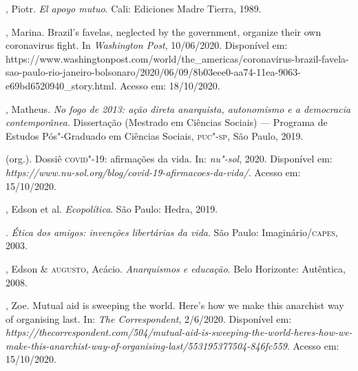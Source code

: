 \begin{bibliohedra}
, Piotr. \emph{El apoyo mutuo}. Cali: Ediciones Madre Tierra,
1989.

, Marina. Brazil's favelas, neglected by the government, organize
their own coronavirus fight. In \emph{Washington Post}, 10/06/2020.
Disponível em:
https://www.washingtonpost.com/world/the\_americas/coronavirus-brazil-favela-sao-paulo-rio-janeiro-bolsonaro/2020/06/09/8b03eee0-aa74-11ea-9063-e69bd6520940\_story.html.
Acesso em: 18/10/2020.

, Matheus. \emph{No fogo de 2013: ação direta anarquista,
autonomismo e a democracia contemporânea}. Dissertação (Mestrado em
Ciências Sociais) --- Programa de Estudos Pós"-Graduado em Ciências
Sociais, \textsc{puc"-sp}, São Paulo, 2019.

 (org.). Dossiê \textsc{covid}"-19: afirmações da vida. In: \emph{nu"-sol},
2020. Disponível em:
\emph{https://www.nu-sol.org/blog/covid-19-afirmacoes-da-vida/}. Acesso
em: 15/10/2020.

, Edson et al. \emph{Ecopolítica}. São Paulo: Hedra, 2019.

\titidem. \emph{Ética dos amigos: invenções libertárias da vida}. São
Paulo: Imaginário/\textsc{capes}, 2003.

, Edson \& \textsc{augusto}, Acácio. \emph{Anarquismos e educação}. Belo
Horizonte: Autêntica, 2008.

, Zoe. Mutual aid is sweeping the world. Here's how we make this
anarchist way of organising last. In: \emph{The Correspondent},
2/6/2020. Disponível em:
\emph{https://thecorrespondent.com/504/mutual-aid-is-sweeping-the-world-heres-how-we-make-this-anarchist-way-of-organising-last/553195377504-846fc559}.
Acesso em: 15/10/2020.
\end{bibliohedra}


